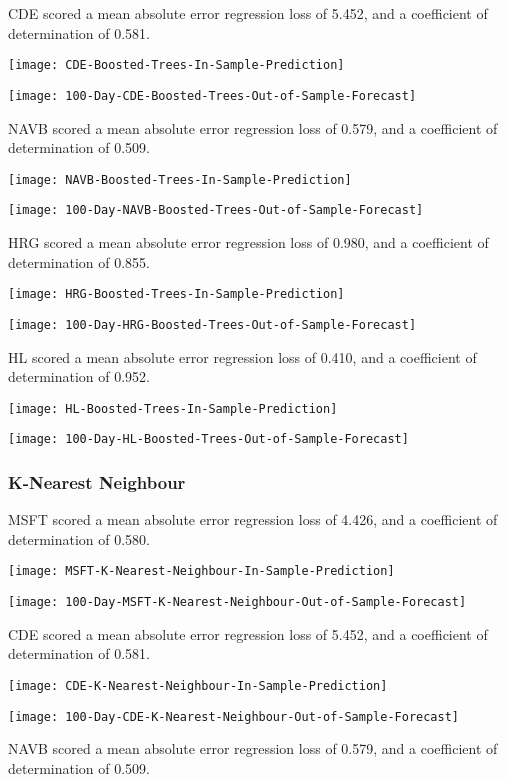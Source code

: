CDE scored a mean absolute error regression loss of 5.452, and a coefficient of determination of 0.581.

\texttt{[image: CDE-Boosted-Trees-In-Sample-Prediction]}

\texttt{[image: 100-Day-CDE-Boosted-Trees-Out-of-Sample-Forecast]}

NAVB scored a mean absolute error regression loss of 0.579, and a coefficient of determination of 0.509.

\texttt{[image: NAVB-Boosted-Trees-In-Sample-Prediction]}

\texttt{[image: 100-Day-NAVB-Boosted-Trees-Out-of-Sample-Forecast]}

HRG scored a mean absolute error regression loss of 0.980, and a coefficient of determination of 0.855.

\texttt{[image: HRG-Boosted-Trees-In-Sample-Prediction]}

\texttt{[image: 100-Day-HRG-Boosted-Trees-Out-of-Sample-Forecast]}

HL scored a mean absolute error regression loss of 0.410, and a coefficient of determination of 0.952.

\texttt{[image: HL-Boosted-Trees-In-Sample-Prediction]}

\texttt{[image: 100-Day-HL-Boosted-Trees-Out-of-Sample-Forecast]}

\subsubsection{K-Nearest Neighbour}
MSFT scored a mean absolute error regression loss of 4.426, and a coefficient of determination of 0.580.

\texttt{[image: MSFT-K-Nearest-Neighbour-In-Sample-Prediction]}

\texttt{[image: 100-Day-MSFT-K-Nearest-Neighbour-Out-of-Sample-Forecast]}

CDE scored a mean absolute error regression loss of 5.452, and a coefficient of determination of 0.581.

\texttt{[image: CDE-K-Nearest-Neighbour-In-Sample-Prediction]}

\texttt{[image: 100-Day-CDE-K-Nearest-Neighbour-Out-of-Sample-Forecast]}

NAVB scored a mean absolute error regression loss of 0.579, and a coefficient of determination of 0.509.

